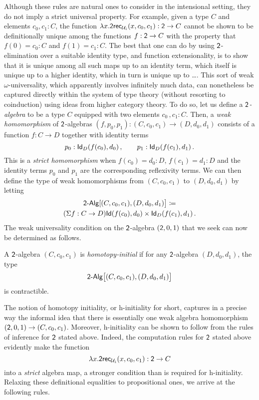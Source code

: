 Although these rules are natural ones to consider in the intensional setting, they do not imply a strict universal property. For example, given a type $C$ and elements $c_0, c_1 : 
C$, the function $\lambda x . \mathsf{2rec}_{\mathcal{U}_i}(x, c_0,c_1) : \mathsf{2} \rightarrow C$ cannot  be shown to be definitionally unique among the functions $f :  
\mathsf{2} \rightarrow C$ with the property that $f(0)=c_0 : C$ and $f(1)=c_1 : C$.  
The best that one can do by using $\mathsf{2}$-elimination over a suitable identity type, and function extensionality, is to show that it is unique among all such maps up to an identity term, which itself is unique up to a higher identity, which in turn is unique up to \ldots. This sort of weak $\omega$-universality, which apparently involves infinitely much data, can nonetheless be captured directly within the system of type theory (without resorting to coinduction) using ideas from higher category theory. To do so, let us define a \emph{$\mathsf{2}$-algebra} to be a type $C$ equipped with two elements
$c_0 \, , c_1 : C$. Then, a \emph{weak homomorphism} of $\mathsf{2}$-algebras
$(f, p_0, p_1) : (C, c_0,c_1)\rightarrow (D,d_0,d_1)$  
consists of a  function $f : C\rightarrow D$ together with identity terms 
\[
p_0 :  \mathsf{Id}_{D}(f (c_0) ,d_0) \, , \qquad p_1 :   \mathsf{Id}_{D}(f (c_1), d_1) \, .
\]
This is a \emph{strict homomorphism} when $f (c_0) = d_0 : D$, $f (c_1) = d_1 : D $ and the identity terms $p_0$ and $p_1$ are the corresponding reflexivity terms.  We can then define the type of weak homomorphisms from $(C, c_0,c_1)$ to $(D,d_0,d_1)$ by letting
\begin{multline*}
\BoolAlg [ (C, c_0,c_1), (D,d_0,d_1) \big] \defeq \\
 (\Sigma f: C \rightarrow D) \Id(f (c_0), d_0) \times\id{D}(f (c_1), d_1) \, .
\end{multline*}
The weak universality condition on the $\mathsf{2}$-algebra $(\mathsf{2}, 0, 1)$ that we seek can now be determined as follows. 

\begin{definition} \label{thm:boolhinitial}
A $\mathsf{2}$-algebra $(C, c_0,c_1)$ is \emph{homotopy-initial} if for any $\mathsf{2}$-algebra $(D,d_0,d_1)$, the type 
\[
\BoolAlg \big[ (C, c_0,c_1), (D,d_0,d_1)\big]
\] 
is contractible.
\end{definition}

\noindent The notion of homotopy initiality, or h-initiality for short, captures in a precise way the informal idea that there is essentially one weak algebra homomorphism $(\mathsf{2}, 0, 1) \rightarrow (C,c_0,c_1)$.  Moreover, h-initiality can be shown to follow from the rules of inference for $\mathsf{2}$ stated above.  Indeed, the  computation rules for $\mathsf{2}$ stated above
 evidently make the function
\[
\lambda x . \mathsf{2rec}_{\mathcal{U}_i}(x, c_0,c_1) : \mathsf{2} \rightarrow C
\]
into a \emph{strict} algebra map, a stronger condition than is required for h-initiality.  Relaxing these 
definitional equalities to propositional ones, we arrive at the following rules.

